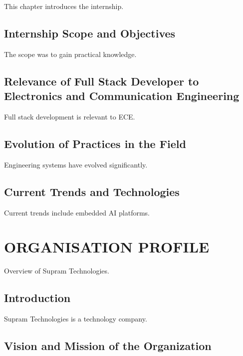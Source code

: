 \documentclass[12pt,a4paper]{report}
\begin{document}
This chapter introduces the internship.


\section{Internship Scope and Objectives}

The scope was to gain practical knowledge.


\section{Relevance of Full Stack Developer to Electronics and Communication Engineering}

Full stack development is relevant to ECE.


\section{Evolution of Practices in the Field}

Engineering systems have evolved significantly.


\section{Current Trends and Technologies}

Current trends include embedded AI platforms.




\chapter{ORGANISATION PROFILE}
\label{ch:org}


Overview of Supram Technologies.


\section{Introduction}

Supram Technologies is a technology company.




\section{Vision and Mission of the Organization}
\end{document}
